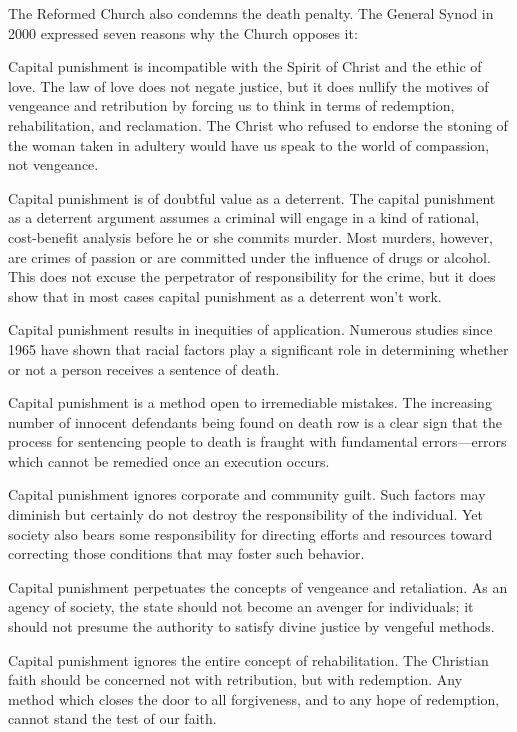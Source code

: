 The Reformed Church also condemns the death penalty. The General Synod
in 2000 expressed seven reasons why the Church opposes it:

Capital punishment is incompatible with the Spirit of Christ and the
ethic of love. The law of love does not negate justice, but it does
nullify the motives of vengeance and retribution by forcing us to think
in terms of redemption, rehabilitation, and reclamation. The Christ who
refused to endorse the stoning of the woman taken in adultery would have
us speak to the world of compassion, not vengeance.

Capital punishment is of doubtful value as a deterrent. The capital
punishment as a deterrent argument assumes a criminal will engage in a
kind of rational, cost-benefit analysis before he or she commits murder.
Most murders, however, are crimes of passion or are committed under the
influence of drugs or alcohol. This does not excuse the perpetrator of
responsibility for the crime, but it does show that in most cases
capital punishment as a deterrent won't work.

Capital punishment results in inequities of application. Numerous
studies since 1965 have shown that racial factors play a significant
role in determining whether or not a person receives a sentence of
death.

Capital punishment is a method open to irremediable mistakes. The
increasing number of innocent defendants being found on death row is a
clear sign that the process for sentencing people to death is fraught
with fundamental errors---errors which cannot be remedied once an
execution occurs.

Capital punishment ignores corporate and community guilt. Such factors
may diminish but certainly do not destroy the responsibility of the
individual. Yet society also bears some responsibility for directing
efforts and resources toward correcting those conditions that may foster
such behavior.

Capital punishment perpetuates the concepts of vengeance and
retaliation. As an agency of society, the state should not become an
avenger for individuals; it should not presume the authority to satisfy
divine justice by vengeful methods.

Capital punishment ignores the entire concept of rehabilitation. The
Christian faith should be concerned not with retribution, but with
redemption. Any method which closes the door to all forgiveness, and to
any hope of redemption, cannot stand the test of our faith.


